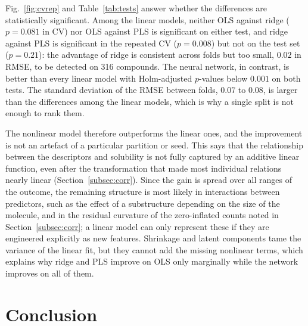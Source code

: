 \documentclass[conference]{IEEEtran}
\begin{document}
Fig.~\ref{fig:cvrep} and Table~\ref{tab:tests} answer whether the
differences are statistically significant. Among the linear models,
neither OLS against ridge ($p = 0.081$ in CV) nor OLS against PLS is
significant on either test, and ridge against PLS is significant in the
repeated CV ($p = 0.008$) but not on the test set ($p = 0.21$): the advantage of
ridge is consistent across folds but too small, $0.02$ in RMSE, to be
detected on 316 compounds. The neural network, in contrast, is better
than every linear model with Holm-adjusted $p$-values below $0.001$ on
both tests. The standard deviation of the RMSE between folds, $0.07$
to $0.08$, is larger than the differences among the linear models,
which is why a single split is not enough to rank them.

The nonlinear model therefore outperforms the linear ones, and the
improvement is not an artefact of a particular partition or seed. This
says that the relationship between the descriptors and solubility is
not fully captured by an additive linear function, even after the
transformation that made most individual relations nearly linear
(Section~\ref{subsec:corr}). Since the gain is spread over all ranges of the outcome,
the remaining structure is most likely in interactions between
predictors, such as the effect of a substructure depending on the size
of the molecule, and in the residual curvature of the zero-inflated
counts noted in Section~\ref{subsec:corr}; a linear model can only
represent these if they are engineered explicitly as new features. Shrinkage and latent components tame the
variance of the linear fit, but they cannot add the missing nonlinear
terms, which explains why ridge and PLS improve on OLS only marginally
while the network improves on all of them.

\section{Conclusion}
\label{sec:conclusion}
\end{document}
